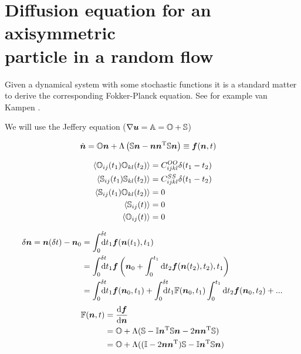 \documentclass[thesis.tex]{subfiles}
\begin{document}
\chapter{Diffusion equation for an axisymmetric\\particle in a random flow}

Given a dynamical system with some stochastic functions it is a standard matter to derive the corresponding Fokker-Planck equation. See for example van Kampen \cite{kampen07}. 

We will use the Jeffery equation ($\nabla \mbox{\boldmath$u$} = \mathbb{A} = \mathbb{O} + \mathbb{S}$)

\begin{align*}
	\dot{\mbox{\boldmath$n$}} &= \mathbb{O} \mbox{\boldmath$n$} + \Lambda\left(\mathbb{S} \mbox{\boldmath$n$} - \mbox{\boldmath$n$} \mbox{\boldmath$n$}^{\mathrm T}\mathbb{S} \mbox{\boldmath$n$}\right)	\equiv \mbox{\boldmath$f$}(\mbox{\boldmath$n$}, t)
\end{align*}


\begin{align*}
	\left \langle \mathbb{O}_{ij}(t_1)\mathbb{O}_{kl}(t_2)\right \rangle &= C^{OO}_{ijkl}\delta(t_1-t_2) \\
	\left \langle \mathbb{S}_{ij}(t_1)\mathbb{S}_{kl}(t_2)\right \rangle &= C^{SS}_{ijkl}\delta(t_1-t_2) \\
	\left \langle \mathbb{S}_{ij}(t_1)\mathbb{O}_{kl}(t_2)\right \rangle &= 0 \\
	\left \langle \mathbb{S}_{ij}(t)\right \rangle &= 0 \\
	\left \langle \mathbb{O}_{ij}(t)\right \rangle &= 0
\end{align*}


\begin{align*}
	\delta \ve n = \ve n(\delta t) - \ve n_0 &= \int_0^{\delta t}\!\!\!\!\!\rd t_1 \ve f (\ve n(t_1 ), t_1)\\
	&= \int_0^{\delta t}\!\!\!\!\!\rd t_1 \ve f\left(\ve n_0 + \int_0^{t_1}\rd t_2 \ve f(\ve n(t_2),t_2), t_1\right)\\
	&= \int_0^{\delta t}\!\!\!\!\!\rd t_1 \ve f (\ve n_0, t_1)+\int_0^{\delta t}\!\!\!\!\!\rd t_1 \ma F (\ve n_0, t_1)\int_0^{t_1}\rd t_2 \ve f(\ve n_0, t_2) + ...
\end{align*}
\begin{align*}
	\mathbb{F}(\mbox{\boldmath$n$}, t) &= \frac{\mathrm{d} \mbox{\boldmath$f$}}{\mathrm{d} \mbox{\boldmath$n$}} \\
	&= \mathbb{O} + \Lambda(\mathbb{S} - \mathbb{I} \mbox{\boldmath$n$}^{\mathrm T} \mathbb{S} \mbox{\boldmath$n$} - 2\mbox{\boldmath$n$}\mbox{\boldmath$n$}^{\mathrm T} \mathbb{S}) \\
	& = \mathbb{O} + \Lambda( (\mathbb{I} - 2\mbox{\boldmath$n$} \mbox{\boldmath$n$}^{\mathrm T})\mathbb{S} - \mathbb{I} \mbox{\boldmath$n$}^{\mathrm T} \mathbb{S} \mbox{\boldmath$n$} )
\end{align*}
\end{document}
